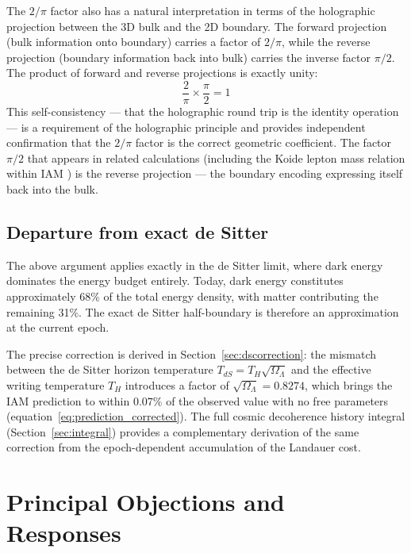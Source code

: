 \documentclass[12pt,a4paper]{article}
\begin{document}
The $2/\pi$ factor also has a natural interpretation in terms of the
holographic projection between the 3D bulk and the 2D boundary. The
forward projection (bulk information onto boundary) carries a factor of
$2/\pi$, while the reverse projection (boundary information back into
bulk) carries the inverse factor $\pi/2$. The product of forward and
reverse projections is exactly unity:
\begin{equation}
\frac{2}{\pi} \times \frac{\pi}{2} = 1
\label{eq:roundtrip}
\end{equation}
This self-consistency — that the holographic round trip is the identity
operation — is a requirement of the holographic principle and provides
independent confirmation that the $2/\pi$ factor is the correct geometric
coefficient. The factor $\pi/2$ that appears in related calculations
(including the Koide lepton mass relation within IAM
\citep{mahaffey2026_koide}) is the reverse projection — the boundary
encoding expressing itself back into the bulk.

\subsection{Departure from exact de Sitter}

The above argument applies exactly in the de Sitter limit, where dark
energy dominates the energy budget entirely. Today, dark energy
constitutes approximately 68\% of the total energy density, with matter
contributing the remaining 31\%. The exact de Sitter half-boundary is
therefore an approximation at the current epoch.

The precise correction is derived in Section~\ref{sec:dscorrection}: the
mismatch between the de Sitter horizon temperature
$T_{dS} = T_H\sqrt{\Omega_\Lambda}$ and the effective writing temperature
$T_H$ introduces a factor of $\sqrt{\Omega_\Lambda} = 0.8274$, which
brings the IAM prediction to within $0.07\%$ of the observed value with
no free parameters (equation~\ref{eq:prediction_corrected}). The full
cosmic decoherence history integral (Section~\ref{sec:integral}) provides
a complementary derivation of the same correction from the epoch-dependent
accumulation of the Landauer cost.

\section{Principal Objections and Responses}
\label{sec:objections}
\end{document}
